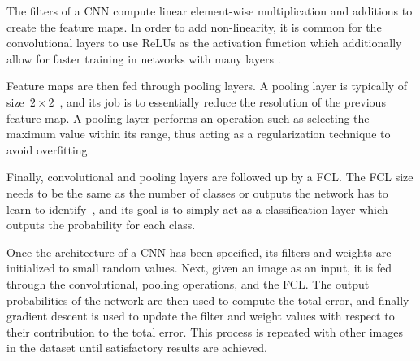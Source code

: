 The filters of a CNN compute linear element-wise multiplication and additions to create the feature maps. In order to add non-linearity, it is common for the convolutional layers to use ReLUs as the activation function which additionally allow for faster training in networks with many layers \cite{cnn-star-galaxy}.

Feature maps are then fed through pooling layers. A pooling layer is typically of size~$2 \times 2$~\cite{NIPS2012_4824}, and  its job is to essentially reduce the resolution of the previous feature map. A pooling layer performs an operation such as selecting the maximum value within its range, thus acting as a regularization technique to avoid overfitting.

Finally, convolutional and pooling layers are followed up by a FCL. The FCL size needs to be the same as the number of classes or outputs the network has to learn to identify~\cite{Ciresan11flexible}, and its goal is to simply act as a classification layer which outputs the probability for each class.

Once the architecture of a CNN has been specified, its filters and weights are initialized to small random values. Next, given an image as an input, it is fed through the convolutional, pooling operations, and the FCL. The output probabilities of the network are then used to compute the total error, and finally gradient descent is used to update the filter and weight values with respect to their contribution to the total error. This process is repeated with other images in the dataset until satisfactory results are achieved.
